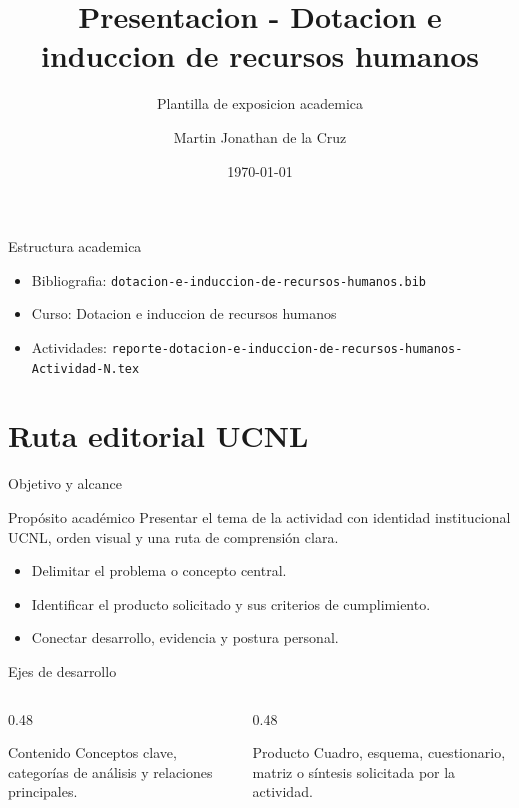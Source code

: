 ﻿\documentclass[spanish,aspectratio=169]{beamer}
\title{Presentacion - Dotacion e induccion de recursos humanos}
\subtitle{Plantilla de exposicion academica}
\author{Martin Jonathan de la Cruz}
\institute{Universidad Ciudadana de Nuevo Leon}
\date{\today}
\begin{document}
\begin{frame}
  \titlepage
\end{frame}

\begin{frame}{Estructura academica}
  \begin{itemize}
    \item Bibliografia: \texttt{dotacion-e-induccion-de-recursos-humanos.bib}
    \item Curso: Dotacion e induccion de recursos humanos
    \item Actividades: \texttt{reporte-dotacion-e-induccion-de-recursos-humanos-Actividad-N.tex}
  \end{itemize}
\end{frame}


\section{Ruta editorial UCNL}

\begin{frame}{Objetivo y alcance}
  \begin{block}{Propósito académico}
    Presentar el tema de la actividad con identidad institucional UCNL, orden visual y una ruta de comprensión clara.
  \end{block}
  \begin{itemize}
    \item Delimitar el problema o concepto central.
    \item Identificar el producto solicitado y sus criterios de cumplimiento.
    \item Conectar desarrollo, evidencia y postura personal.
  \end{itemize}
\end{frame}

\begin{frame}{Ejes de desarrollo}
  \begin{columns}[T,totalwidth=\textwidth]
    \begin{column}{0.48\textwidth}
      \begin{block}{Contenido}
        Conceptos clave, categorías de análisis y relaciones principales.
      \end{block}
    \end{column}
    \begin{column}{0.48\textwidth}
      \begin{block}{Producto}
        Cuadro, esquema, cuestionario, matriz o síntesis solicitada por la actividad.
      \end{block}
    \end{column}
  \end{columns}
\end{frame}
\end{document}
